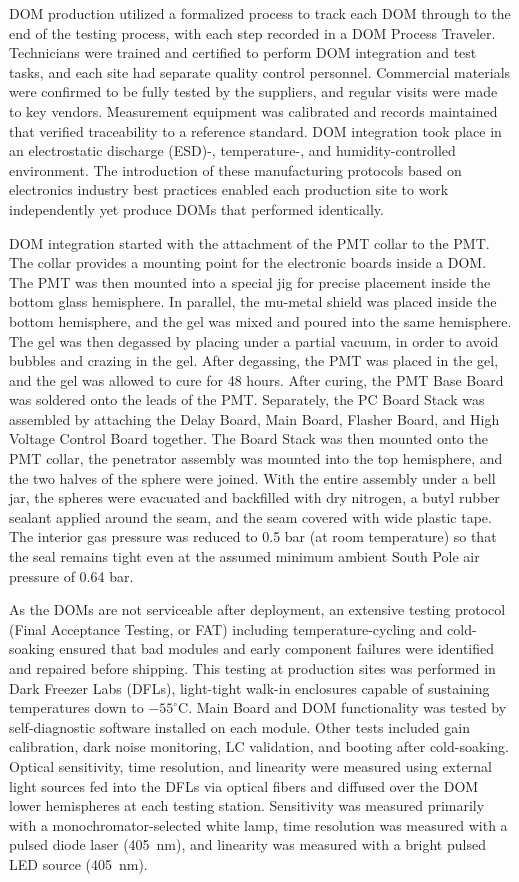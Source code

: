 DOM production utilized a formalized process to track each DOM through to
the end of the testing process, with each step recorded in a DOM Process
Traveler.  Technicians were trained and certified to perform DOM
integration and test tasks, and each site had separate quality control
personnel. Commercial materials were confirmed to be fully tested by the
suppliers, and regular visits were made to key vendors.  Measurement
equipment was calibrated and records maintained that verified
traceability to a reference standard.  DOM integration took place in
an electrostatic discharge (ESD)-, temperature-, and humidity-controlled environment.  The introduction
of these manufacturing protocols based on electronics industry best
practices enabled each production site to work independently yet
produce DOMs that performed identically.

DOM integration started with the attachment of the PMT collar
to the PMT.  The collar provides a mounting point for the electronic boards inside
a DOM. The PMT was then mounted into a special jig for precise
placement inside the bottom glass hemisphere.  In parallel, the mu-metal
shield was placed inside the bottom hemisphere, and the
gel was mixed and poured into the same hemisphere. The gel was then
degassed by placing under a partial vacuum, in order to avoid bubbles and
crazing in the gel. 
After degassing, the PMT was placed in the gel, and the gel was allowed to
cure for 48 hours.  After curing, the PMT Base Board was soldered onto the
leads of the 
PMT.  Separately, the PC Board Stack was assembled by attaching the Delay
Board, Main Board, Flasher Board, and High Voltage Control Board together.
The Board Stack was then mounted onto the PMT collar, the penetrator assembly
was mounted into the top hemisphere, and the two halves of the sphere were
joined.  With the entire assembly under a bell jar, the spheres were
evacuated and backfilled with dry nitrogen, 
a butyl rubber sealant applied around the seam, and the seam covered with
wide plastic tape. The interior gas pressure was reduced to 0.5 bar (at
room temperature) so that the seal remains tight even at the assumed minimum
ambient South Pole air pressure of 0.64 bar.

As the DOMs are not serviceable after deployment, an extensive testing
protocol (Final Acceptance Testing, or FAT) including temperature-cycling
and cold-soaking ensured that bad modules and early component failures were
identified and repaired before shipping.  This testing at production sites
was performed in Dark Freezer Labs (DFLs), light-tight walk-in 
enclosures capable of sustaining temperatures down to $-55^\circ$C.  Main Board
and DOM functionality was tested by self-diagnostic software installed on
each module.  Other tests included gain calibration, dark noise monitoring,
LC validation, and booting after cold-soaking.  Optical sensitivity, time resolution,
and linearity were measured using external light sources fed into the DFLs
via optical fibers and diffused over the DOM lower hemispheres at each
testing station. Sensitivity was measured primarily with a
monochromator-selected white lamp, time resolution was measured with a
pulsed diode laser (405~nm), and linearity was measured with a bright
pulsed LED source (405~nm).


